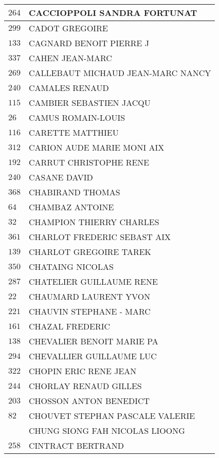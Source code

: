\begin{xltabular}{\linewidth}{|l|X|}
    \hline
    $264$ & CACCIOPPOLI SANDRA FORTUNAT \\
    \hline
    $299$ & CADOT GREGOIRE \\
    \hline
    $133$ & CAGNARD BENOIT PIERRE J \\
    \hline
    $337$ & CAHEN JEAN-MARC \\
    \hline
    $269$ & CALLEBAUT MICHAUD JEAN-MARC NANCY \\
    \hline
    $240$ & CAMALES RENAUD \\
    \hline
    $115$ & CAMBIER SEBASTIEN JACQU \\
    \hline
    $26$ & CAMUS ROMAIN-LOUIS \\
    \hline
    $116$ & CARETTE MATTHIEU \\
    \hline
    $312$ & CARION AUDE MARIE MONI AIX \\
    \hline
    $192$ & CARRUT CHRISTOPHE RENE \\
    \hline
    $240$ & CASANE DAVID \\
    \hline
    $368$ & CHABIRAND THOMAS \\
    \hline
    $64$ & CHAMBAZ ANTOINE \\
    \hline
    $32$ & CHAMPION THIERRY CHARLES \\
    \hline
    $361$ & CHARLOT FREDERIC SEBAST AIX \\
    \hline
    $139$ & CHARLOT GREGOIRE TAREK \\
    \hline
    $350$ & CHATAING NICOLAS \\
    \hline
    $287$ & CHATELIER GUILLAUME RENE \\
    \hline
    $22$ & CHAUMARD LAURENT YVON \\
    \hline
    $221$ & CHAUVIN STEPHANE - MARC \\
    \hline
    $161$ & CHAZAL FREDERIC \\
    \hline
    $138$ & CHEVALIER BENOIT MARIE PA \\
    \hline
    $294$ & CHEVALLIER GUILLAUME LUC \\
    \hline
    $322$ & CHOPIN ERIC RENE JEAN \\
    \hline
    $244$ & CHORLAY RENAUD GILLES \\
    \hline
    $203$ & CHOSSON ANTON BENEDICT \\
    \hline
    $82$ & CHOUVET STEPHAN PASCALE VALERIE \\
    \hline
    & CHUNG SIONG FAH NICOLAS LIOONG \\
    \hline
    $258$ & CINTRACT BERTRAND \\

\end{xltabular}
